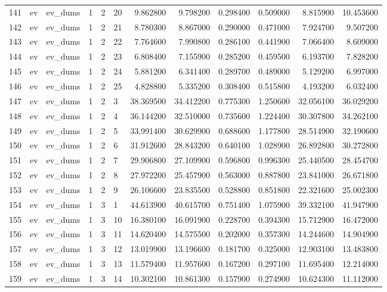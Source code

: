 \begin{tabular}{llllllrrrrrr}
141 & ev & ev_dums & 1 & 2 & 20 & 9.862800 & 9.798200 & 0.298400 & 0.509000 & 8.815900 & 10.453600 \\
142 & ev & ev_dums & 1 & 2 & 21 & 8.780300 & 8.867000 & 0.290000 & 0.471000 & 7.924700 & 9.507200 \\
143 & ev & ev_dums & 1 & 2 & 22 & 7.764600 & 7.990800 & 0.286100 & 0.441900 & 7.066400 & 8.609000 \\
144 & ev & ev_dums & 1 & 2 & 23 & 6.808400 & 7.155900 & 0.285200 & 0.459500 & 6.193700 & 7.828200 \\
145 & ev & ev_dums & 1 & 2 & 24 & 5.881200 & 6.341400 & 0.289700 & 0.489000 & 5.129200 & 6.997000 \\
146 & ev & ev_dums & 1 & 2 & 25 & 4.828800 & 5.335200 & 0.308400 & 0.515800 & 4.193200 & 6.032400 \\
147 & ev & ev_dums & 1 & 2 & 3 & 38.369500 & 34.412200 & 0.775300 & 1.250600 & 32.056100 & 36.029200 \\
148 & ev & ev_dums & 1 & 2 & 4 & 36.144200 & 32.510000 & 0.735600 & 1.224400 & 30.307800 & 34.262100 \\
149 & ev & ev_dums & 1 & 2 & 5 & 33.991400 & 30.629900 & 0.688600 & 1.177800 & 28.514900 & 32.190600 \\
150 & ev & ev_dums & 1 & 2 & 6 & 31.912600 & 28.843200 & 0.640100 & 1.028900 & 26.892800 & 30.272800 \\
151 & ev & ev_dums & 1 & 2 & 7 & 29.906800 & 27.109900 & 0.596800 & 0.996300 & 25.440500 & 28.454700 \\
152 & ev & ev_dums & 1 & 2 & 8 & 27.972200 & 25.457900 & 0.563000 & 0.887800 & 23.841000 & 26.671800 \\
153 & ev & ev_dums & 1 & 2 & 9 & 26.106600 & 23.835500 & 0.528800 & 0.851800 & 22.321600 & 25.002300 \\
154 & ev & ev_dums & 1 & 3 & 1 & 44.613900 & 40.615700 & 0.751400 & 1.075900 & 39.332100 & 41.947900 \\
155 & ev & ev_dums & 1 & 3 & 10 & 16.380100 & 16.091900 & 0.228700 & 0.394300 & 15.712900 & 16.472000 \\
156 & ev & ev_dums & 1 & 3 & 11 & 14.620400 & 14.575500 & 0.202000 & 0.357300 & 14.244600 & 14.904900 \\
157 & ev & ev_dums & 1 & 3 & 12 & 13.019900 & 13.196600 & 0.181700 & 0.325000 & 12.903100 & 13.483800 \\
158 & ev & ev_dums & 1 & 3 & 13 & 11.579400 & 11.957600 & 0.167200 & 0.297100 & 11.695400 & 12.214000 \\
159 & ev & ev_dums & 1 & 3 & 14 & 10.302100 & 10.861300 & 0.157900 & 0.274900 & 10.624300 & 11.112000 \\

\end{tabular}

